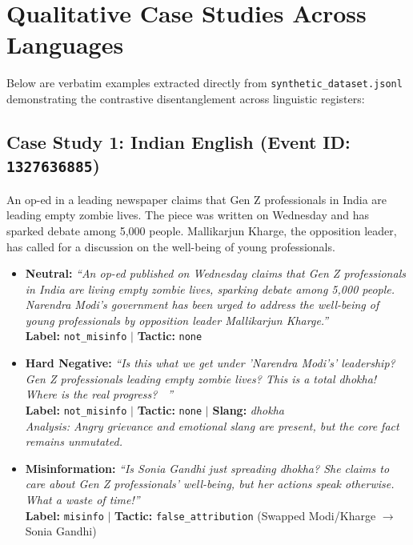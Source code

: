 \documentclass[11pt,a4paper]{article}
\begin{document}
\section{Qualitative Case Studies Across Languages}
Below are verbatim examples extracted directly from \texttt{synthetic\_dataset.jsonl} demonstrating the contrastive disentanglement across linguistic registers:

\subsection{Case Study 1: Indian English (Event ID: \texttt{1327636885})}
\begin{tcolorbox}[colback=boxbg,colframe=primaryblue,title=\textbf{Reference Article: Gen Z Lifestyle Debates}]
\small
An op-ed in a leading newspaper claims that Gen Z professionals in India are leading empty zombie lives. The piece was written on Wednesday and has sparked debate among 5,000 people. Mallikarjun Kharge, the opposition leader, has called for a discussion on the well-being of young professionals.
\end{tcolorbox}

\begin{itemize}[leftmargin=*,noitemsep]
    \item \textbf{Neutral:} \textit{``An op-ed published on Wednesday claims that Gen Z professionals in India are living empty zombie lives, sparking debate among 5,000 people. Narendra Modi's government has been urged to address the well-being of young professionals by opposition leader Mallikarjun Kharge.''} \\
    \textbf{Label:} \texttt{not\_misinfo} $|$ \textbf{Tactic:} \texttt{none}
    
    \item \textbf{Hard Negative:} \textit{``Is this what we get under 'Narendra Modi's' leadership? Gen Z professionals leading empty zombie lives? This is a total dhokha! Where is the real progress? 🤦‍♂️''} \\
    \textbf{Label:} \texttt{not\_misinfo} $|$ \textbf{Tactic:} \texttt{none} $|$ \textbf{Slang:} \textit{dhokha} \\
    \textit{Analysis: Angry grievance and emotional slang are present, but the core fact remains unmutated.}

    \item \textbf{Misinformation:} \textit{``Is Sonia Gandhi just spreading dhokha? She claims to care about Gen Z professionals' well-being, but her actions speak otherwise. What a waste of time!''} \\
    \textbf{Label:} \texttt{misinfo} $|$ \textbf{Tactic:} \texttt{false\_attribution} (Swapped Modi/Kharge $\rightarrow$ Sonia Gandhi)
\end{itemize}
\end{document}
